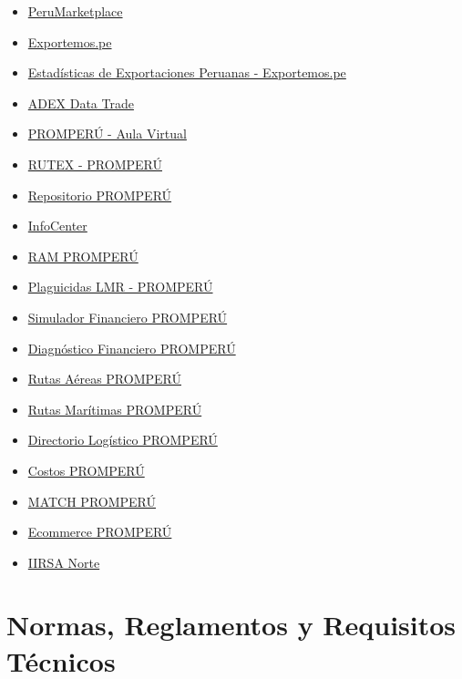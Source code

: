 \documentclass[
  jou,
  floatsintext,
  longtable,
  a4paper,
  nolmodern,
  notxfonts,
  notimes,
  12pt,
  colorlinks=true,linkcolor=blue,citecolor=blue,urlcolor=blue]{apa7}
\providecommand{\tightlist}{%
  \setlength{\itemsep}{0pt}\setlength{\parskip}{0pt}}
\begin{document}
\begin{itemize}
\tightlist
\item
  \href{https://www.perumarketplace.com/en}{PeruMarketplace}
\item
  \href{https://exportemos.pe/}{Exportemos.pe}
\item
  \href{https://exportemos.pe/descubre-oportunidades-de-exportacion/estadisticas-de-exportaciones-peruanas}{Estadísticas
  de Exportaciones Peruanas - Exportemos.pe}
\item
  \href{https://adexdatatrade.com/}{ADEX Data Trade}
\item
  \href{https://aulavirtual.promperu.gob.pe/}{PROMPERÚ - Aula Virtual}
\item
  \href{https://rutex.promperu.gob.pe/}{RUTEX - PROMPERÚ}
\item
  \href{https://repositorio.promperu.gob.pe/home}{Repositorio PROMPERÚ}
\item
  \href{https://infocenter.gob.pe/}{InfoCenter}
\item
  \href{https://ram.promperu.gob.pe/}{RAM PROMPERÚ}
\item
  \href{https://plaguicidaslmr.promperu.gob.pe/}{Plaguicidas LMR -
  PROMPERÚ}
\item
  \href{https://simuladorfinanciero.promperu.gob.pe/}{Simulador
  Financiero PROMPERÚ}
\item
  \href{https://diagnosticofinanciero.promperu.gob.pe/}{Diagnóstico
  Financiero PROMPERÚ}
\item
  \href{https://rutasaereas.promperu.gob.pe/}{Rutas Aéreas PROMPERÚ}
\item
  \href{https://rutasmaritimas.promperu.gob.pe/}{Rutas Marítimas
  PROMPERÚ}
\item
  \href{https://directoriologistico.promperu.gob.pe/}{Directorio
  Logístico PROMPERÚ}
\item
  \href{https://costos.promperu.gob.pe/}{Costos PROMPERÚ}
\item
  \href{https://match.promperu.gob.pe/}{MATCH PROMPERÚ}
\item
  \href{https://ecommerce.promperu.gob.pe/}{Ecommerce PROMPERÚ}
\item
  \href{https://www.iirsanorte.com.pe/}{IIRSA Norte}
\end{itemize}

\section{Normas, Reglamentos y Requisitos
Técnicos}\label{normas-reglamentos-y-requisitos-tuxe9cnicos}
\end{document}
